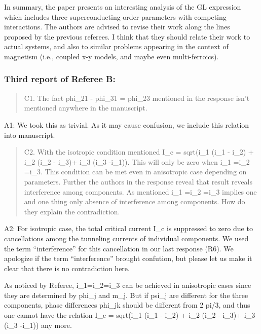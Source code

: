 \documentclass[11pt]{article}
\begin{document}
In summary, the paper presents an interesting analysis of the GL
expression which includes three superconducting order-parameters with
competing interactions. The authors are advised to revise their work
along the lines proposed by the previous referees. I think that they
should relate their work to actual systems, and also to similar problems
appearing in the context of magnetism (i.e., coupled x-y models, and
maybe even multi-ferroics).

\hypertarget{third-report-of-referee-b}{%
\subsubsection{Third report of Referee
B:}\label{third-report-of-referee-b}}

\begin{quote}
C1. The fact phi\_21 - phi\_31 = phi\_23 mentioned in the response isn't
mentioned anywhere in the manuscript.
\end{quote}

A1: We took this as trivial. As it may cause confusion, we include this
relation into manuscript.

\begin{quote}
C2. With the isotropic condition mentioned I\_c = sqrt(i\_1 (i\_1 -
i\_2) + i\_2 (i\_2 - i\_3)+ i\_3 (i\_3 -i\_1)). This will only be zero
when i\_1 =i\_2 =i\_3. This condition can be met even in anisotropic
case depending on parameters. Further the authors in the response reveal
that result reveals interference among components. As mentioned i\_1
=i\_2 =i\_3 implies one and one thing only absence of interference among
components. How do they explain the contradiction.
\end{quote}

A2: For isotropic case, the total critical current I\_c is suppressed to
zero due to cancellations among the tunneling currents of individual
components. We used the term ``interference'' for this cancellation in
our last response (R6). We apologize if the term ``interference''
brought confution, but please let us make it clear that there is no
contradiction here.

As noticed by Referee, i\_1=i\_2=i\_3 can be achieved in anisotropic
cases since they are determined by phi\_j and m\_j. But if psi\_j are
different for the three components, phase differences phi\_jk should be
different from 2 pi/3, and thus one cannot have the relation I\_c =
sqrt(i\_1 (i\_1 - i\_2) + i\_2 (i\_2 - i\_3)+ i\_3 (i\_3 -i\_1)) any
more.
\end{document}
